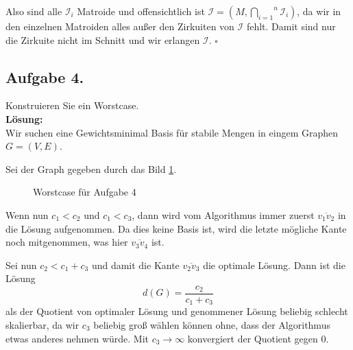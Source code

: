 \documentclass[11pt,a4paper,ngerman]{article}
\begin{document}
Also sind alle $\mathcal{I}_i$ Matroide und offensichtlich ist
$\mathcal{I} = (M, \overset{n}{\underset{i=1}{\bigcap}} \mathcal{I}_i)$,
da wir in den einzelnen Matroiden alles außer den Zirkuiten von $\mathcal{I}$ 
fehlt. Damit sind nur die Zirkuite nicht im Schnitt und wir erlangen $\mathcal{I}$.
\mbox{}\hfill$\square$

\subsection*{Aufgabe 4.}
Konstruieren Sie ein Worstcase.\\

\textbf{Lösung:}\\

Wir suchen eine Gewichtsminimal Basis für stabile Mengen in eingem Graphen
$G = (V,E)$.

Sei der Graph gegeben durch das Bild \ref{disk:ueb6:wc}.

\begin{figure}[h!]
    \centering
    \caption{Worstcase für Aufgabe 4}
    \label{disk:ueb6:wc}
\end{figure}

Wenn nun $c_1 < c_2$ und $c_1 < c_3$, dann wird vom Algorithmus immer zuerst $\overline{v_1v_2}$
in die Lösung aufgenommen. Da dies keine Basis ist, wird die letzte mögliche Kante noch mitgenommen,
was hier $\overline{v_3v_4}$ ist.

Sei nun $c_2 < c_1 + c_3$ und damit die Kante $\overline{v_2v_3}$ die optimale Lösung.
Dann ist die Lösung
\begin{equation}
    d(G) = \frac{c_2}{c_1 + c_3}
\end{equation}
als der Quotient von optimaler Lösung und genommener Lösung beliebig schlecht skalierbar,
da wir $c_3$ beliebig groß wählen können ohne, dass der Algorithmus etwas anderes nehmen würde.
Mit $c_3 \rightarrow \infty$ konvergiert der Quotient gegen $0$.

\label{LastPage}
\end{document}
